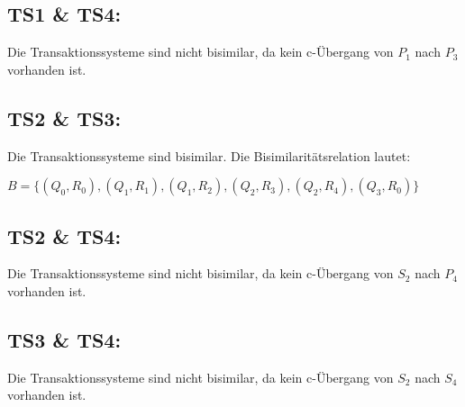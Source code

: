\documentclass[10pt,a4paper]{article}
\begin{document}
\subsection*{TS1 \& TS4:}
Die Transaktionssysteme sind nicht bisimilar, da kein c-Übergang von $P_{1}$ nach $P_{3}$ vorhanden ist.

\subsection*{TS2 \& TS3:}
Die Transaktionssysteme sind bisimilar. Die Bisimilaritätsrelation lautet:

$B = \{(Q_{0},R_{0}),(Q_{1},R_{1}),(Q_{1},R_{2}),(Q_{2},R_{3}),(Q_{2},R_{4}),(Q_{3},R_{0})\}$

\subsection*{TS2 \& TS4:}
Die Transaktionssysteme sind nicht bisimilar, da kein c-Übergang von $S_{2}$ nach $P_{4}$ vorhanden ist.

\subsection*{TS3 \& TS4:}
Die Transaktionssysteme sind nicht bisimilar, da kein c-Übergang von $S_{2}$ nach $S_{4}$ vorhanden ist.
\end{document}
